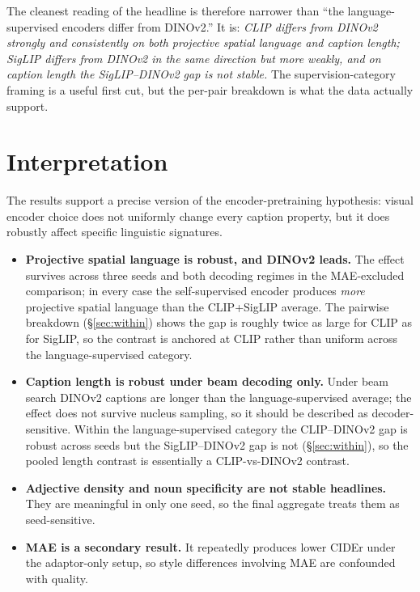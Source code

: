 \documentclass[11pt]{article}
\begin{document}
The cleanest reading of the headline is therefore narrower than ``the
language-supervised encoders differ from DINOv2.'' It is: \emph{CLIP differs
from DINOv2 strongly and consistently on both projective spatial language and
caption length; SigLIP differs from DINOv2 in the same direction but more
weakly, and on caption length the SigLIP--DINOv2 gap is not stable.} The
supervision-category framing is a useful first cut, but the per-pair
breakdown is what the data actually support.

\section{Interpretation}

The results support a precise version of the encoder-pretraining hypothesis:
visual encoder choice does not uniformly change every caption property, but it
does robustly affect specific linguistic signatures.

\begin{itemize}
  \item \textbf{Projective spatial language is robust, and DINOv2 leads.} The
  effect survives across three seeds and both decoding regimes in the
  MAE-excluded comparison; in every case the self-supervised encoder produces
  \emph{more} projective spatial language than the CLIP+SigLIP average. The
  pairwise breakdown (\S\ref{sec:within}) shows the gap is roughly twice as
  large for CLIP as for SigLIP, so the contrast is anchored at CLIP rather
  than uniform across the language-supervised category.
  \item \textbf{Caption length is robust under beam decoding only.} Under beam
  search DINOv2 captions are longer than the language-supervised average; the
  effect does not survive nucleus sampling, so it should be described as
  decoder-sensitive. Within the language-supervised category the
  CLIP--DINOv2 gap is robust across seeds but the SigLIP--DINOv2 gap is not
  (\S\ref{sec:within}), so the pooled length contrast is essentially a
  CLIP-vs-DINOv2 contrast.
  \item \textbf{Adjective density and noun specificity are not stable
  headlines.} They are meaningful in only one seed, so the final aggregate
  treats them as seed-sensitive.
  \item \textbf{MAE is a secondary result.} It repeatedly produces lower CIDEr
  under the adaptor-only setup, so style differences involving MAE are
  confounded with quality.
\end{itemize}
\end{document}
